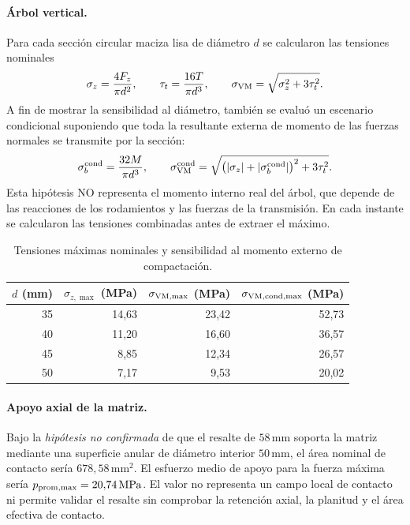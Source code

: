 \paragraph{Árbol vertical.} Para cada sección circular maciza lisa de diámetro $d$ se calcularon las tensiones nominales
\begin{equation}
\sigma_z=\frac{4F_z}{\pi d^2},\qquad
\tau_t=\frac{16T}{\pi d^3},\qquad
\sigma_{\rm VM}=\sqrt{\sigma_z^2+3\tau_t^2}.
\end{equation}
A fin de mostrar la sensibilidad al diámetro, también se evaluó un escenario condicional suponiendo que toda la resultante externa de momento de las fuerzas normales se transmite por la sección:
\begin{equation}
\sigma_b^{\mathrm{cond}}=\frac{32M}{\pi d^3},\qquad
\sigma_{\rm VM}^{\mathrm{cond}}=\sqrt{\bigl(|\sigma_z|+|\sigma_b^{\mathrm{cond}}|\bigr)^2+3\tau_t^2}.
\end{equation}
Esta hipótesis NO representa el momento interno real del árbol, que depende de las reacciones de los rodamientos y las fuerzas de la transmisión. En cada instante se calcularon las tensiones combinadas antes de extraer el máximo.
\begin{table}[ht]
\centering
\caption{Tensiones máximas nominales y sensibilidad al momento externo de compactación.}
\begin{tabular}{@{}rrrr@{}}
\toprule
$d$ (mm) & $\sigma_{z,\max}$ (MPa) & $\sigma_{\rm VM,\max}$ (MPa) & $\sigma_{\rm VM,cond,\max}$ (MPa)\\
\midrule
35 & 14,63 & 23,42 & 52,73\\
40 & 11,20 & 16,60 & 36,57\\
45 & 8,85 & 12,34 & 26,57\\
50 & 7,17 & 9,53 & 20,02\\
\bottomrule
\end{tabular}
\end{table}

\paragraph{Apoyo axial de la matriz.} Bajo la \emph{hipótesis no confirmada} de que el resalte de $58\,\mathrm{mm}$ soporta la matriz mediante una superficie anular de diámetro interior $50\,\mathrm{mm}$, el área nominal de contacto sería $678{,}58\,\mathrm{mm^2}$. El esfuerzo medio de apoyo para la fuerza máxima sería $p_{\rm prom,max}=20{,}74\,\mathrm{MPa}$. El valor no representa un campo local de contacto ni permite validar el resalte sin comprobar la retención axial, la planitud y el área efectiva de contacto.

